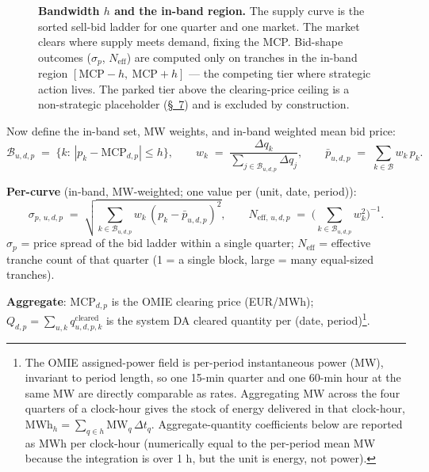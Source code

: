 \documentclass[11pt]{article}
\begin{document}
\begin{figure}[htbp]
\caption{\textbf{Bandwidth $h$ and the in-band region.} The supply curve
is the sorted sell-bid ladder for one quarter and one market. The market
clears where supply meets demand, fixing the MCP. Bid-shape outcomes
($\sigma_p$, $N_{\text{eff}}$) are computed only on tranches in the
in-band region $[\text{MCP}-h,\ \text{MCP}+h]$ --- the competing tier
where strategic action lives. The parked tier above the clearing-price
ceiling is a non-strategic placeholder (\hyperref[sec:context]{\S~7}) and
is excluded by construction.}
\label{fig:in-band-bandwidth}
\end{figure}

Now define the in-band set, MW weights, and in-band weighted mean bid price:
\[
\mathcal{B}_{u,d,p} \;=\; \{k:\,|p_k-\text{MCP}_{d,p}|\le h\}, \qquad w_k \;=\; \frac{\Delta q_k}{\sum_{j\in\mathcal{B}_{u,d,p}} \Delta q_j}, \qquad \bar p_{u,d,p} \;=\; \sum_{k\in\mathcal{B}} w_k\,p_k.
\]

\textbf{Per-curve} (in-band, MW-weighted; one value per (unit, date, period)):
\[
\sigma_{p,\,u,d,p} \;=\; \sqrt{\sum_{k\in\mathcal{B}_{u,d,p}} w_k\,(p_k-\bar p_{u,d,p})^2}, \qquad
N_{\text{eff},\,u,d,p} \;=\; \Big(\sum_{k\in\mathcal{B}_{u,d,p}} w_k^2\Big)^{-1}.
\]
$\sigma_p$ = price spread of the bid ladder within a single quarter; $N_{\text{eff}}$ = effective tranche count of that quarter (1 = a single block, large = many equal-sized tranches).
\vspace{10pt}


\textbf{Aggregate}: $\text{MCP}_{d,p}$ is the OMIE clearing price (EUR/MWh); $Q_{d,p}=\sum_{u,k} q^{\text{cleared}}_{u,d,p,k}$ is the system DA cleared quantity per (date, period)\footnote{The OMIE assigned-power field is per-period instantaneous power (MW), invariant to period length, so one 15-min quarter and one 60-min hour at the same MW are directly comparable as rates. Aggregating MW across the four quarters of a clock-hour gives the stock of energy delivered in that clock-hour, $\text{MWh}_h = \sum_{q\in h}\text{MW}_q\,\Delta t_q$. Aggregate-quantity coefficients below are reported as MWh per clock-hour (numerically equal to the per-period mean MW because the integration is over 1 h, but the unit is energy, not power).}.
\vspace{10pt}
\end{document}
